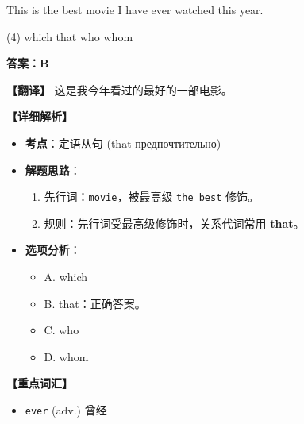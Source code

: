 \documentclass[11pt, a4paper]{article}
\newcommand{\analysis}[4]{
    \begin{solutionbox}
        \textbf{答案：#1}
        
        \textbf{【翻译】} #2
        
        \textbf{【详细解析】}
        #3
        
        \textbf{【重点词汇】}
        #4
    \end{solutionbox}
}
\newcommand{\blank}{\underline{\hspace{1.5cm}}}
\begin{document}
\begin{questions}
    \item This is the best movie \blank I have ever watched this year.
    \begin{tasks}(4)
        \task which \task that \task who \task whom
    \end{tasks}
    \analysis{B}{这是我今年看过的最好的一部电影。}{
        \begin{itemize}
            \item \textbf{考点}：定语从句 (that предпочтительно)
            \item \textbf{解题思路}：
                \begin{enumerate}
                    \item 先行词：\texttt{movie}，被最高级 \texttt{the best} 修饰。
                    \item 规则：先行词受最高级修饰时，关系代词常用 \textbf{that}。
                \end{enumerate}
            \item \textbf{选项分析}：
                \begin{itemize}
                    \item A. which
                    \item B. that：正确答案。
                    \item C. who
                    \item D. whom
                \end{itemize}
        \end{itemize}
    }{
        \begin{itemize}
            \item \texttt{ever} (adv.) 曾经
        \end{itemize}
    }


\end{questions}
\end{document}
